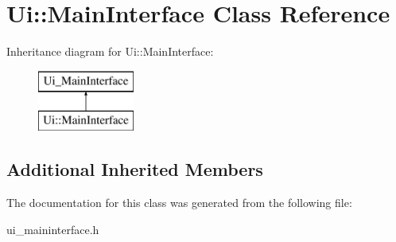 \hypertarget{class_ui_1_1_main_interface}{}\section{Ui\+:\+:Main\+Interface Class Reference}
\label{class_ui_1_1_main_interface}
Inheritance diagram for Ui\+:\+:Main\+Interface\+:\begin{figure}[H]
\begin{center}
\leavevmode
\includegraphics[height=2.000000cm]{class_ui_1_1_main_interface}
\end{center}
\end{figure}
\subsection*{Additional Inherited Members}


The documentation for this class was generated from the following file\+:\begin{DoxyCompactItemize}
\item 
ui\+\_\+maininterface.\+h\end{DoxyCompactItemize}

